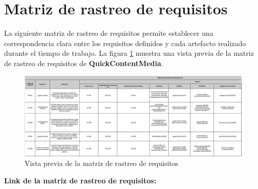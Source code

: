 \section{Matriz de rastreo de requisitos}
La siguiente matriz de rastreo de requisitos permite establecer una correspondencia clara entre los requisitos definidos y cada artefacto realizado durante el tiempo de trabajo. La figura \ref{fig:MatrizRastreo} muestra una vista previa de la matriz de rastreo de requisitos de \textbf{QuickContentMedia}.

\begin{figure}[H]
    \centering
    \includegraphics[width=1.1\textwidth]{Media/2_SeccionAdministrativa/MatrizRastreo.png}
    \caption{Vista previa de la matriz de rastreo de requisitos} 
    \label{fig:MatrizRastreo}
\end{figure}

\textbf{Link de la matriz de rastreo de requisitos:} \linkMatrizRastreo \\